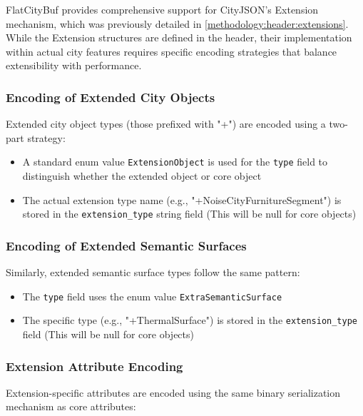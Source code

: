 FlatCityBuf provides comprehensive support for CityJSON's Extension mechanism, which was previously detailed in \autoref{methodology:header:extensions}. While the Extension structures are defined in the header, their implementation within actual city features requires specific encoding strategies that balance extensibility with performance.

\subsubsection{Encoding of Extended City Objects}
\label{methodology:feature_encoding:extension_mechanism:city_objects}

Extended city object types (those prefixed with "+") are encoded using a two-part strategy:

\begin{itemize}
  \item A standard enum value \texttt{ExtensionObject} is used for the \texttt{type} field to distinguish whether the extended object or core object
  \item The actual extension type name (e.g., "+NoiseCityFurnitureSegment") is stored in the \texttt{extension\_type} string field (This will be null for core objects)
\end{itemize}

\subsubsection{Encoding of Extended Semantic Surfaces}
\label{methodology:feature_encoding:extension_mechanism:semantic_surfaces}

Similarly, extended semantic surface types follow the same pattern:

\begin{itemize}
  \item The \texttt{type} field uses the enum value \texttt{ExtraSemanticSurface}
  \item The specific type (e.g., "+ThermalSurface") is stored in the \texttt{extension\_type} field (This will be null for core objects)
\end{itemize}

\subsubsection{Extension Attribute Encoding}
\label{methodology:feature_encoding:extension_mechanism:attributes}

Extension-specific attributes are encoded using the same binary serialization mechanism as core attributes:

